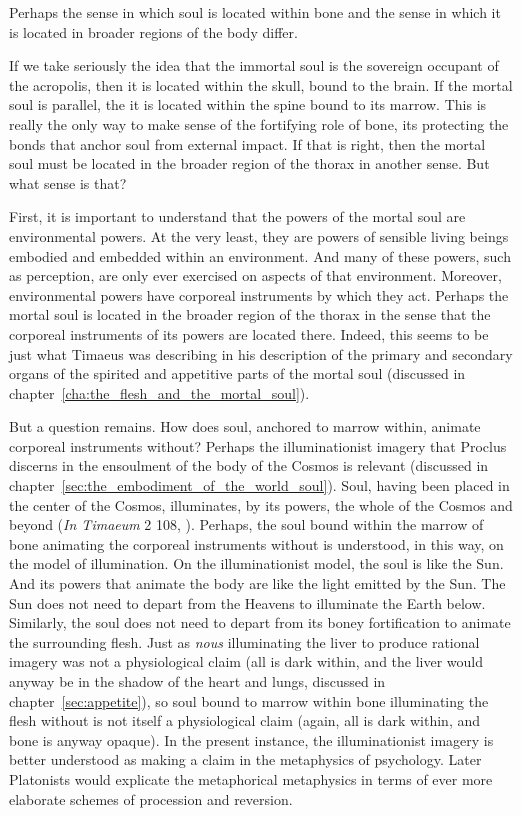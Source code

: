 Perhaps the sense in which soul is located within bone and the sense in which it is located in broader regions of the body differ. 

If we take seriously the idea that the immortal soul is the sovereign occupant of the acropolis, then it is located within the skull, bound to the brain. If the mortal soul is parallel, the it is located within the spine bound to its marrow. This is really the only way to make sense of the fortifying role of bone, its protecting the bonds that anchor soul from external impact. If that is right, then the mortal soul must be located in the broader region of the thorax in another sense. But what sense is that?

First, it is important to understand that the powers of the mortal soul are environmental powers. At the very least, they are powers of sensible living beings embodied and embedded within an environment. And many of these powers, such as perception, are only ever exercised on aspects of that environment. Moreover, environmental powers have corporeal instruments by which they act. Perhaps the mortal soul is located in the broader region of the thorax in the sense that the corporeal instruments of its powers are located there. Indeed, this seems to be just what Timaeus was describing in his description of the primary and secondary organs of the spirited and appetitive parts of the mortal soul (discussed in chapter~\ref{cha:the_flesh_and_the_mortal_soul}).

But a question remains. How does soul, anchored to marrow within, animate corporeal instruments without? Perhaps the illuminationist imagery that Proclus discerns in the ensoulment of the body of the Cosmos is relevant (discussed in chapter~\ref{sec:the_embodiment_of_the_world_soul}). Soul, having been placed in the center of the Cosmos, illuminates, by its powers, the whole of the Cosmos and beyond (\emph{In Timaeum} 2 108, \citealt{Diehl:1903re}). Perhaps, the soul bound within the marrow of bone animating the corporeal instruments without is understood, in this way, on the model of illumination. On the illuminationist model, the soul is like the Sun. And its powers that animate the body are like the light emitted by the Sun. The Sun does not need to depart from the Heavens to illuminate the Earth below. Similarly, the soul does not need to depart from its boney fortification to animate the surrounding flesh. Just as \emph{nous} illuminating the liver to produce rational imagery was not a physiological claim (all is dark within, and the liver would anyway be in the shadow of the heart and lungs, discussed in chapter~\ref{sec:appetite}), so soul bound to marrow within bone illuminating the flesh without is not itself a physiological claim (again, all is dark within, and bone is anyway opaque). In the present instance, the illuminationist imagery is better understood as making a claim in the metaphysics of psychology. Later Platonists would explicate the metaphorical metaphysics in terms of ever more elaborate schemes of procession and reversion.


